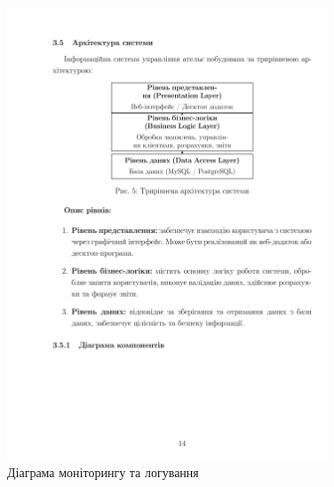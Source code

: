 \documentclass[14pt,a4paper]{extarticle}
\begin{document}
\begin{figure}[h!]
\centering
\includegraphics[width=0.85\textwidth]{diagrams/diagram-15.png}
\caption{Діаграма моніторингу та логування}
\end{figure}

\newpage
\end{document}
